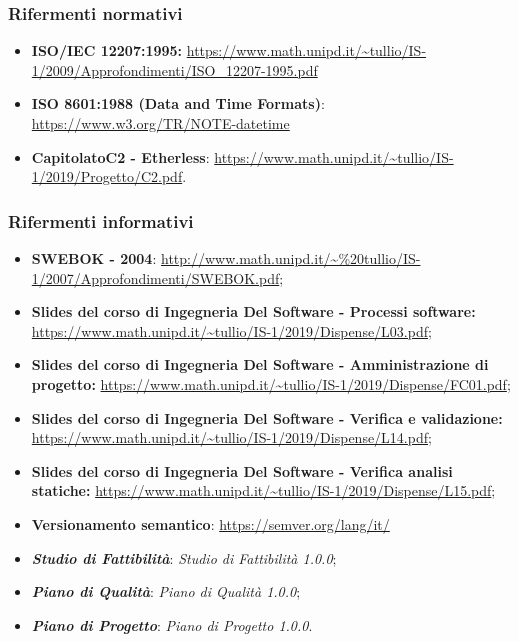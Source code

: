\subsubsection{Rifermenti normativi}
\begin{itemize}
  \item \textbf{ISO/IEC 12207:1995:} \url{https://www.math.unipd.it/~tullio/IS-1/2009/Approfondimenti/ISO_12207-1995.pdf}
  \item \textbf{ISO 8601:1988 (Data and Time Formats)}: \url {https://www.w3.org/TR/NOTE-datetime} 
  \item \textbf{Capitolato\glo C2 - Etherless}: \url{https://www.math.unipd.it/~tullio/IS-1/2019/Progetto/C2.pdf}.
\end{itemize}

\subsubsection{Rifermenti informativi}
\begin{itemize}
  \item \textbf{SWEBOK - 2004}: \url{http://www.math.unipd.it/~\%20tullio/IS-1/2007/Approfondimenti/SWEBOK.pdf};
  \item \textbf{Slides del corso di Ingegneria Del Software - Processi software:} \url{https://www.math.unipd.it/~tullio/IS-1/2019/Dispense/L03.pdf};
  \item \textbf{Slides del corso di Ingegneria Del Software - Amministrazione di progetto:} \url{https://www.math.unipd.it/~tullio/IS-1/2019/Dispense/FC01.pdf};
  \item \textbf{Slides del corso di Ingegneria Del Software - Verifica e validazione:} \url{https://www.math.unipd.it/~tullio/IS-1/2019/Dispense/L14.pdf};
  \item \textbf{Slides del corso di Ingegneria Del Software - Verifica analisi statiche:} \url{https://www.math.unipd.it/~tullio/IS-1/2019/Dispense/L15.pdf};
  \item \textbf{Versionamento semantico}: \url{https://semver.org/lang/it/}
  \item \textbf{\textit{Studio di Fattibilità}}: \textit{Studio di Fattibilità 1.0.0\docs};
  \item \textbf{\textit{Piano di Qualità}}: \textit{Piano di Qualità 1.0.0\docs};
  \item \textbf{\textit{Piano di Progetto}}: \textit{Piano di Progetto 1.0.0\docs}.

\end{itemize}
